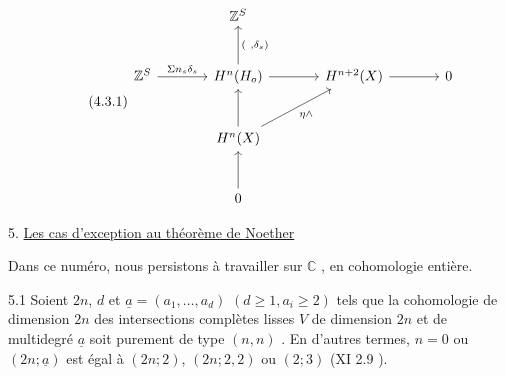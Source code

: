 \begin{equation}\tag{4.3.1}
\begin{tikzcd}[row sep=large, column sep=large]
{} & \mathbb{Z}^S & {} & {} \\
\mathbb{Z}^S \arrow[r, "{\Sigma n_s \delta_s}"] & H^n(H_o) \arrow[u, "{( \ , \delta_s)}"'] \arrow[r] & H^{n+2}(X) \arrow[r] & 0 \\
{} & H^n(X) \arrow[u] \arrow[ur, "{\eta\wedge}"'] & {} & {} \\
{} & 0 \arrow[u] & {} &
{} \end{tikzcd}
\end{equation}



5. \underline{Les cas d'exception au théorème de Noether}

Dans ce numéro, nous persistons à travailler sur $\mathbb{C}$ , en cohomologie entière.

5.1 \quad Soient $2n$, $d$ et $\underline{a} = (a_1,\ldots,a_d)$ $(d \geq 1, a_i \geq 2)$ tels que la cohomologie de dimension $2n$ des intersections complètes lisses $V$ de dimension $2n$ et de multidegré $\underline{a}$ soit purement de type $(n, n)$ . En d'autres termes, $n = 0$ ou $(2n; \underline{a})$ est égal à $(2n; 2)$, $(2n; 2, 2)$ ou $(2; 3)$ (XI 2.9 ).


